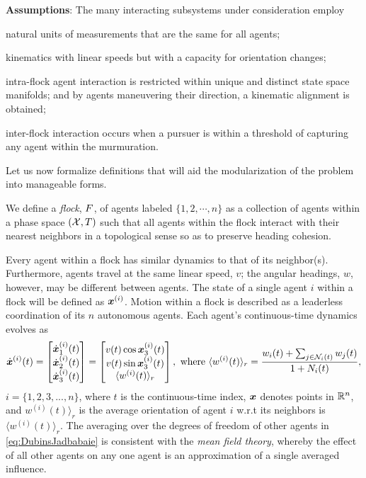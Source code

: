  \textbf{Assumptions}:
The many interacting subsystems under consideration employ
 \begin{inparaenum}[(i)]
 	\item natural units of measurements that are the same for all agents; 
 	\item kinematics with linear speeds but with a capacity for orientation changes;
 	\item intra-flock agent interaction is restricted within unique and distinct state space manifolds; and by agents maneuvering their direction, a kinematic alignment is obtained;
 	\item inter-flock interaction occurs when a pursuer is within a threshold of capturing any agent within the murmuration.
 \end{inparaenum} 
%
Let us now formalize definitions that will aid the modularization of the problem into manageable forms.
%
\begin{definition}
	We define a \textit{flock}, $F$, of agents labeled $\{1, 2, \cdots, n\}$  as a collection of agents within a phase space $(\mathcal{X}, T)$ such that all agents within the flock interact with their nearest neighbors in a topological sense so as to preserve heading cohesion.
	\label{def:flock}
\end{definition}
%
	Every agent within a flock has similar dynamics to that of its neighbor(s). Furthermore, agents travel at the same linear speed, $v$; the angular headings, $w$, however, may be different between agents. The state of a single agent $i$ within a flock will be defined as $\bm{x}^{(i)}$. Motion within a flock is described as a leaderless coordination of its $n$ autonomous agents.  Each agent's continuous-time dynamics evolves as
	\begin{align}
		\dot{\bm{x}}^{(i)}(t) 
		= \begin{bmatrix}
			\dot{\bm{x}}^{(i)}_1(t) \\ \dot{\bm{x}}^{(i)}_2 (t) \\ \dot{\bm{x}}^{(i)}_3 (t)
		\end{bmatrix} = \begin{bmatrix}
			v(t) \cos \bm{x}_3^{(i)}(t) \\ v(t)\sin \bm{x}_3^{(i)}(t) \\ \langle w^{(i)}(t) \rangle_r
		\end{bmatrix}, \text{ where } 	\langle w^{(i)}(t) \rangle_r = \dfrac{w_i(t) + \sum_{j \in \mathcal{N}_i(t)} w_j(t)}{1+N_i(t)},
		\label{eq:DubinsJadbabaie}
	\end{align}
	 $i = \{1, 2, 3, ..., n\}$, where $t$ is the continuous-time index, $\bm{x}$ denotes points in $\mathbb{R}^n$, and $w^{(i)}(t) \rangle_r$ is the average orientation of agent $i$ w.r.t its neighbors is $\langle w^{(i)}(t) \rangle_r$. The averaging over the degrees of freedom of other agents in \eqref{eq:DubinsJadbabaie} is consistent with the \textit{mean field theory}, whereby the effect of all other agents on any one agent is an approximation of a single averaged influence.

